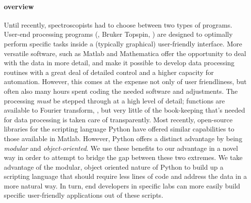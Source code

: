 \paragraph{overview}
Until recently,
    spectroscopists had to choose between two types of programs.
User-end processing programs
    (\eg, Bruker Topspin, \etc)
    are designed to optimally perform specific tasks
    inside a (typically graphical) user-friendly interface.
More versatile software,
    such as Matlab and Mathematica offer the opportunity
    to deal with the data in more detail,
    and make it possible to develop data processing routines
    with a great deal of detailed control
    and a higher capacity for automation.
However,
    this comes at the expense not only of user friendliness,
    but often also many hours spent coding the needed
    software and adjustments.
The processing \textit{must} be stepped through at a high level
    of detail;
    functions are available to Fourier transform, \etc,
    but
    very little of the book-keeping that's needed for data
    processing is taken care of transparently.
Most recently,
    open-source libraries for the scripting language Python have
    offered similar capabilities to those available in Matlab.
However, Python offers a distinct advantage by being {\it modular} and {\it object-oriented}.
We use these benefits to our advantage in a novel way
    in order to attempt to bridge the gap between these two extremes.
We take advantage of the modular, object oriented nature of Python
    to build up a scripting language that should require
    less lines of code and address the data in a more natural way.
In turn, end developers in specific labs
    can more easily build specific user-friendly applications
    out of these scripts.
